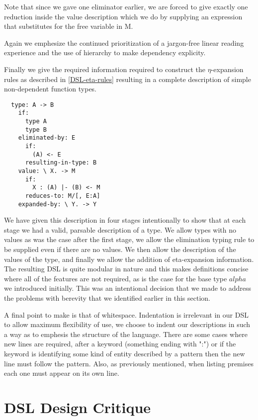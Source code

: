 Note that since we gave one eliminator earlier, we are forced to give
exactly one reduction inside the value description which we do by
supplying an expression that substitutes for the free variable in M.

Again we emphesize the continued prioritization of a jargon-free linear
reading experience and the use of hierarchy to make dependency explicity.

Finally we give the required information required to construct the
$\eta$-expansion rules as described in \ref{DSL-eta-rules} resulting in
a complete description of simple non-dependent function types.

\begin{BVerbatim}
  type: A -> B
    if:
      type A
      type B
    eliminated-by: E
      if:
        (A) <- E
      resulting-in-type: B
    value: \ X. -> M
      if:
        X : (A) |- (B) <- M
      reduces-to: M/[, E:A]
    expanded-by: \ Y. -> Y
\end{BVerbatim}

We have given this description in four stages intentionally to show
that at each stage we had a valid, parsable description of a type. We
allow types with no values as was the case after the first stage, we
allow the elimination typing rule to be supplied even if there are no
values. We then allow the description of the values of the type, and
finally we allow the addition of eta-expansion information. The
resulting DSL is quite modular in nature and this makes definitions
concise where all of the features are not required, as is the case for
the base type $alpha$ we introduced initially. This was an intentional
decision that we made to address the problems with berevity that we
identified earlier in this section.

A final point to make is that of whitespace. Indentation is irrelevant
in our DSL to allow maximum flexibility of use, we choose to indent
our descriptions in such a way as to emphesis the structure of the
language. There are some cases where new lines are required, after a
keyword (something ending with ":") or if the keyword is identifying
some kind of entity described by a pattern then the new line must
follow the pattern. Also, as previously mentioned, when listing
premises each one must appear on its own line.


\section{DSL Design Critique}


